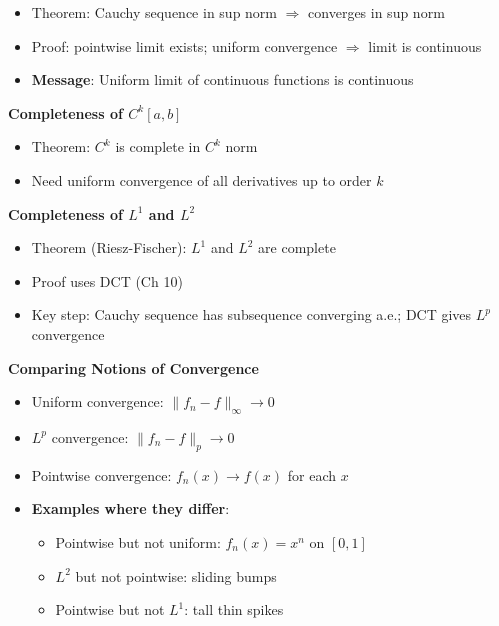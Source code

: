 \documentclass[
  10pt,
  letterpaper,
]{scrbook}
\providecommand{\tightlist}{%
  \setlength{\itemsep}{0pt}\setlength{\parskip}{0pt}}
\begin{document}
\begin{itemize}
\tightlist
\item
  Theorem: Cauchy sequence in sup norm \(\Rightarrow\) converges in sup
  norm
\item
  Proof: pointwise limit exists; uniform convergence \(\Rightarrow\)
  limit is continuous
\item
  \textbf{Message}: Uniform limit of continuous functions is continuous
\end{itemize}

\textbf{Completeness of \(C^k[a,b]\)}

\begin{itemize}
\tightlist
\item
  Theorem: \(C^k\) is complete in \(C^k\) norm
\item
  Need uniform convergence of all derivatives up to order \(k\)
\end{itemize}

\textbf{Completeness of \(L^1\) and \(L^2\)}

\begin{itemize}
\tightlist
\item
  Theorem (Riesz-Fischer): \(L^1\) and \(L^2\) are complete
\item
  Proof uses DCT (Ch 10)
\item
  Key step: Cauchy sequence has subsequence converging a.e.; DCT gives
  \(L^p\) convergence
\end{itemize}

\textbf{Comparing Notions of Convergence}

\begin{itemize}
\tightlist
\item
  Uniform convergence: \(\|f_n - f\|_\infty \to 0\)
\item
  \(L^p\) convergence: \(\|f_n - f\|_p \to 0\)
\item
  Pointwise convergence: \(f_n(x) \to f(x)\) for each \(x\)
\item
  \textbf{Examples where they differ}:

  \begin{itemize}
  \tightlist
  \item
    Pointwise but not uniform: \(f_n(x) = x^n\) on \([0,1]\)
  \item
    \(L^2\) but not pointwise: sliding bumps
  \item
    Pointwise but not \(L^1\): tall thin spikes
  \end{itemize}
\end{itemize}
\end{document}
